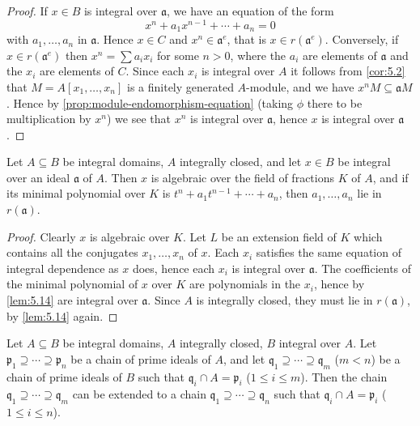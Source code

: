 \begin{proof}
If $x \in B$ is integral over $\mathfrak{a}$, we have an equation of the form
\[
x^n + a_1 x^{n-1} + \cdots + a_n = 0
\]
with $a_1, \ldots, a_n$ in $\mathfrak{a}$. Hence $x \in C$ and $x^n \in \mathfrak{a}^e$, that is $x \in r(\mathfrak{a}^e)$. Conversely, if $x \in r(\mathfrak{a}^e)$ then $x^n = \sum a_i x_i$ for some $n > 0$, where the $a_i$ are elements of $\mathfrak{a}$ and the $x_i$ are elements of $C$. Since each $x_i$ is integral over $A$ it follows from \eqref{cor:5.2} that $M = A[x_1, \ldots, x_n]$ is a finitely generated $A$-module, and we have $x^n M \subseteq \mathfrak{a} M$. Hence by \eqref{prop:module-endomorphism-equation} (taking $\phi$ there to be multiplication by $x^n$) we see that $x^n$ is integral over $\mathfrak{a}$, hence $x$ is integral over $\mathfrak{a}$.
\end{proof}

\begin{proposition}\label{prop:5.15}
    Let $A \subseteq B$ be integral domains, $A$ integrally closed, and let $x \in B$ be integral over an ideal $\mathfrak{a}$ of $A$. Then $x$ is algebraic over the field of fractions $K$ of $A$, and if its minimal polynomial over $K$ is $t^n + a_1 t^{n-1} + \cdots + a_n$, then $a_1, \ldots, a_n$ lie in $r(\mathfrak{a})$.
\end{proposition}

\begin{proof}
Clearly $x$ is algebraic over $K$. Let $L$ be an extension field of $K$ which contains all the conjugates $x_1, \ldots, x_n$ of $x$. Each $x_i$ satisfies the same equation of integral dependence as $x$ does, hence each $x_i$ is integral over $\mathfrak{a}$. The coefficients of the minimal polynomial of $x$ over $K$ are polynomials in the $x_i$, hence by \eqref{lem:5.14} are integral over $\mathfrak{a}$. Since $A$ is integrally closed, they must lie in $r(\mathfrak{a})$, by \eqref{lem:5.14} again.
\end{proof}

\begin{theorem}\label{thm:5.16}
Let $A \subseteq B$ be integral domains, $A$ integrally closed, $B$ integral over $A$. Let $\mathfrak{p}_1 \supseteq \cdots \supseteq \mathfrak{p}_n$ be a chain of prime ideals of $A$, and let $\mathfrak{q}_1 \supseteq \cdots \supseteq \mathfrak{q}_m$ ($m < n$) be a chain of prime ideals of $B$ such that $\mathfrak{q}_i \cap A = \mathfrak{p}_i$ ($1 \leq i \leq m$). Then the chain $\mathfrak{q}_1 \supseteq \cdots \supseteq \mathfrak{q}_m$ can be extended to a chain $\mathfrak{q}_1 \supseteq \cdots \supseteq \mathfrak{q}_n$ such that $\mathfrak{q}_i \cap A = \mathfrak{p}_i$ ($1 \leq i \leq n$).
\end{theorem}

